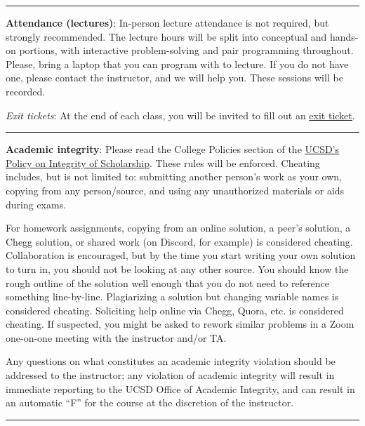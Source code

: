 \documentclass[12pt]{article}
\begin{document}
\begin{center}
	\rule{\textwidth}{0.5pt}
\end{center}

\noindent\textbf{Attendance (lectures)}: In-person lecture attendance is not required, but strongly recommended.
The lecture hours will be split into conceptual and hands-on portions, with interactive problem-solving and pair programming throughout.
Please, bring a laptop that you can program with to lecture.
If you do not have one, please contact the instructor, and we will help you.
These sessions will be recorded.

\emph{Exit tickets}: At the end of each class, you will be invited to fill out an \href{https://forms.gle/4DmG5SjBUEM5pe6U8}{exit ticket}.

\begin{center}
	\rule{\textwidth}{0.5pt}
\end{center}

\noindent\textbf{Academic integrity}: Please read the College Policies section of the \href{http://senate.ucsd.edu/Operating-Procedures/Senate-Manual/Appendices/2}{UCSD's Policy on Integrity of Scholarship}.
These rules will be enforced.
Cheating includes, but is not limited to: submitting another person's work as your own, copying from any person/source, and using any unauthorized materials or aids during exams.

For homework assignments, copying from an online solution, a peer's solution, a Chegg solution, or shared work (on Discord, for example) is considered cheating.
Collaboration is encouraged, but by the time you start writing your own solution to turn in, you should not be looking at any other source.
You should know the rough outline of the solution well enough that you do not need to reference something line-by-line.
Plagiarizing a solution but changing variable names is considered cheating.
Soliciting help online via Chegg, Quora, etc. is considered cheating.
If suspected, you might be asked to rework similar problems in a Zoom one-on-one meeting with the instructor and/or TA.

Any questions on what constitutes an academic integrity violation should be addressed to the instructor; any violation of academic integrity will result in immediate reporting to the UCSD Office of Academic Integrity, and can result in an automatic ``F'' for the course at the discretion of the instructor.

\begin{center}
	\rule{\textwidth}{0.5pt}
\end{center}
\end{document}
